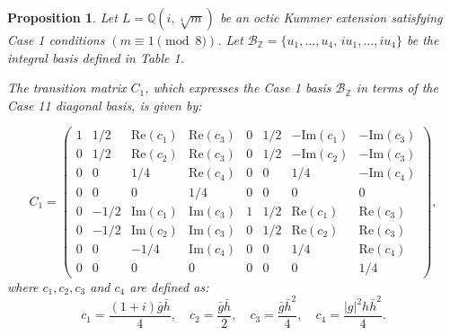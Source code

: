\documentclass{amsart}
\theoremstyle{plain}
\newtheorem{proposition}[theorem]{Proposition}
\theoremstyle{definition}
\theoremstyle{remark}
\numberwithin{equation}{section}
\begin{document}
\begin{proposition}
Let $L = \mathbb{Q}(i, \sqrt[4]{m})$ be an octic Kummer extension satisfying Case 1 conditions $(m \equiv 1 \pmod 8)$. Let $\mathcal{B}_{\mathbb{Z}} = \{u_1, \dots, u_4, \, i u_1, \dots, i u_4\}$ be the integral basis defined in Table 1.

The transition matrix $C_{1}$, which expresses the Case 1 basis $\mathcal{B}_{\mathbb{Z}}$ in terms of the Case 11 diagonal basis, is given by:

\[
C_{1} = \begin{pmatrix}
1 & 1/2 & \text{Re}(c_1) & \text{Re}(c_3) & 0 & 1/2 & -\text{Im}(c_1) & -\text{Im}(c_3) \\
0 & 1/2 & \text{Re}(c_2) & \text{Re}(c_3) & 0 & 1/2 & -\text{Im}(c_2) & -\text{Im}(c_3) \\
0 & 0 & 1/4 & \text{Re}(c_4) & 0 & 0 & 1/4 & -\text{Im}(c_4) \\
0 & 0 & 0 & 1/4 & 0 & 0 & 0 & 0 \\
0 & -1/2 & \text{Im}(c_1) & \text{Im}(c_3) & 1 & 1/2 & \text{Re}(c_1) & \text{Re}(c_3) \\
0 & -1/2 & \text{Im}(c_2) & \text{Im}(c_3) & 0 & 1/2 & \text{Re}(c_2) & \text{Re}(c_3) \\
0 & 0 & -1/4 & \text{Im}(c_4) & 0 & 0 & 1/4 & \text{Re}(c_4) \\
0 & 0 & 0 & 0 & 0 & 0 & 0 & 1/4
\end{pmatrix},
\]
where $c_1,c_2,c_3$ and $c_4$ are defined as:
\[
c_1 = \frac{(1+i)\bar{g}\bar{h}}{4}, \quad c_2 = \frac{\bar{g}\bar{h}}{2}, \quad c_3 = \frac{\bar{g}\bar{h}^2}{4}, \quad c_4 = \frac{|g|^2 h \bar{h}^2}{4}.
\]


\end{proposition}
\end{document}
